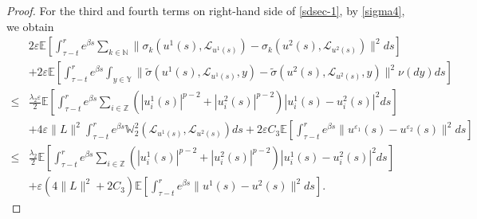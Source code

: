 \documentclass[11pt]{article}
\numberwithin{equation}{section}
\theoremstyle{plain}
\begin{document}
\begin{proof}
For the third and fourth terms on right-hand side of \eqref{sdsec-1},
by \eqref{sigma4}, we obtain
\begin{align}\label{sdsec-4}
	  & 2 \varepsilon \mathbb{E}
               \left[ \int_{\tau-t}^{r} e^{\beta s}
            	            \sum_{k \in \mathbb{N} }
	                               \| \sigma_k(u^1(s), \mathcal{L}_{u^1(s)}) 
	                                  -  \sigma_k(u^2(s), \mathcal{L}_{u^2(s)}) \|^2 ds
         	   \right]  \nonumber\\
	  & + 2 \varepsilon \mathbb{E}
             	  \left[ \int_{\tau-t}^{r} e^{\beta s}
	                           \int_{y \in \mathbb{Y} }
	                                 \| \widetilde{\sigma}(u^1(s), \mathcal{L}_{u^1(s)},y)
	                                    - \widetilde{\sigma}(u^2(s), \mathcal{L}_{u^2(s)},y) \|^2 
	                                 \nu(dy) ds
	              \right]  \nonumber\\
 \le &  \frac{\lambda_2 \varepsilon}{2} 
	         \mathbb{E}
  	                \left[  \int_{\tau-t}^{r} e^{\beta s}
	                              \sum_{ i \in \mathbb{Z}} 
	                                    \left( |u_{i}^1(s)|^{p-2} + |u_{i}^2(s)|^{p-2} \right)    
	                                    |u_{i} ^1(s) - u_{i}^2(s)|^2 ds
	                \right]   \nonumber \\
	  & + 4 \varepsilon \| L\|^2 
	              \int_{\tau-t}^{r} e^{\beta s}
	                  \mathbb{W}_2^2(\mathcal{L}_{u^1(s)},  \mathcal{L}_{u^2(s)} ) ds
	        + 2 \varepsilon C_3
	              \mathbb{E}
	                    \left[  \int_{\tau-t}^{r} e^{\beta s} 
	                                   \|u^{\varepsilon_1}(s) - u^{\varepsilon_2}(s) \|^2 ds
	                    \right]  \nonumber\\
 \le &  \frac{\lambda_2}{2} 
	        \mathbb{E}
	              \left[  \int_{\tau-t}^{r} e^{\beta s}
	                            \sum_{ i \in \mathbb{Z}} 
	                                  \left( |u_{i}^1(s)|^{p-2} + |u_{i}^2(s)|^{p-2} \right)    
	                                  |u_{i} ^1(s) - u_{i}^2(s)|^2 ds
	             \right]   \nonumber \\
	  & + \varepsilon 
	              \left( 4 \| L \|^2 + 2 C_3
                 \right)
	                 \mathbb{E}
	                        \left[ \int_{\tau-t}^{r} e^{\beta s} 
	                                     \|u^1(s) - u^2(s) \|^2 ds
	                        \right].	               
\end{align}
 

\end{proof}
\end{document}
